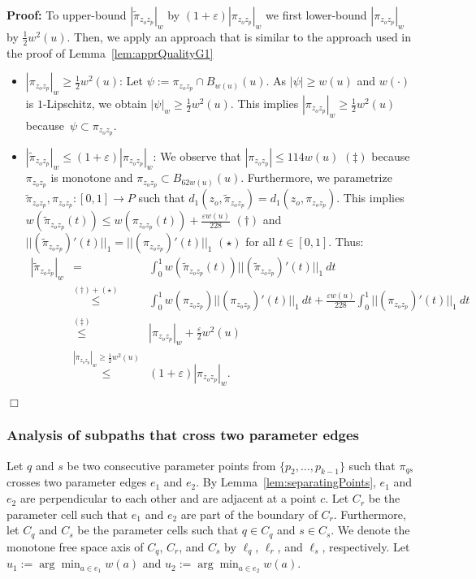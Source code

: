 \documentclass[a4paper,11pt]{article}
\newenvironment{proof}{\textbf{Proof:}}{\hspace*{0mm}\hfill\ensuremath{\Box}}
\begin{document}
\begin{proof}
	To upper-bound $|\widetilde{\pi}_{z_oz_p}|_w$ by $(1+\varepsilon)|\pi_{z_oz_p}|_w$ we first lower-bound $|\pi_{z_oz_p}|_w$ by $\frac{1}{2}w^2(u)$. Then, we apply an approach that is similar to the approach used in the proof of Lemma~\ref{lem:apprQualityG1} 
	\begin{itemize}
		\item $|\pi_{z_oz_p}|_w \geq \frac{1}{2}w^2(u)$: Let $\psi := \pi_{z_oz_p} \cap B_{w(u)}(u)$. As $|\psi| \geq w(u)$ and $w(\cdot)$ is $1$-Lipschitz, we obtain $|\psi|_w \geq \frac{1}{2}w^2(u)$. This implies $|\pi_{z_oz_p}|_w \geq \frac{1}{2}w^2(u)$ because~$\psi \subset \pi_{z_oz_p}$.
		\item $|\widetilde{\pi}_{z_oz_p}|_w \leq (1+\varepsilon) |\pi_{z_oz_p}|_w$: We observe that $|\pi_{z_oz_p}| \leq 114 w(u)$ $(\ddagger)$ because $\pi_{z_oz_p}$ is monotone and $\pi_{z_oz_p} \subset B_{62w(u)}(u)$. Furthermore, we parametrize $\widetilde{\pi}_{z_oz_p}, \pi_{z_oz_p}: [0,1] \rightarrow P$ such that $d_1(z_o, \widetilde{\pi}_{z_oz_p}) = d_1(z_o,\pi_{z_oz_p})$. This implies $w(\widetilde{\pi}_{z_oz_p}(t)) \leq w(\pi_{z_oz_p}(t)) + \frac{\varepsilon w(u)}{228}$ $(\dagger)$ and $||(\widetilde{\pi}_{z_oz_p})'(t)||_1 = ||(\pi_{z_oz_p})'(t)||_1$ $(\star)$ for all $t \in [0,1]$. Thus:
			\begin{eqnarray*}
				|\widetilde{\pi}_{z_oz_p}|_w & = & \int_0^1 w(\widetilde{\pi}_{z_oz_p}(t)) ||(\widetilde{\pi}_{z_oz_p})'(t)||_1 \ dt \\
				& \stackrel{(\dagger) + (\star)}{\leq} & \int_0^1 w(\pi_{z_oz_p})||(\pi_{z_oz_p})'(t)||_1 \ dt + \frac{\varepsilon w(u)}{228}\int_0^1 ||(\pi_{z_oz_p})'(t)||_1 \ dt\\
				& \stackrel{(\ddagger)}{\leq} & |\pi_{z_oz_p}|_w + \frac{\varepsilon}{2}w^2(u)\\
				& \stackrel{|\pi_{z_oz_p}|_w \geq \frac{1}{2}w^2(u)}{\leq}& (1+\varepsilon)|\pi_{z_oz_p}|_w.
			\end{eqnarray*}
	\end{itemize}
\end{proof}
\subsubsection{Analysis of subpaths that cross two parameter edges}\label{subsec:anaTwoCrossing}
	Let $q$ and $s$ be two consecutive parameter points from $\{ p_2,\dots,p_{k-1} \}$ such that $\pi_{qs}$ crosses two parameter edges $e_1$ and $e_2$. By Lemma~\ref{lem:separatingPoints}, $e_1$ and $e_2$ are perpendicular to each other and are adjacent at a point $c$. Let $C_r$ be the parameter cell such that $e_1$ and $e_2$ are part of the boundary of $C_r$. Furthermore, let $C_q$ and $C_s$ be the parameter cells such that $q \in C_q$ and $s \in C_{s}$. We denote the monotone free space axis of $C_q$, $C_r$, and $C_s$ by $\ell_q$, $\ell_r$, and $\ell_s$, respectively. Let $u_1 := \arg \min_{a \in e_1}w(a)$ and $u_2 := \arg \min_{a \in e_2}w(a)$.
\end{document}
